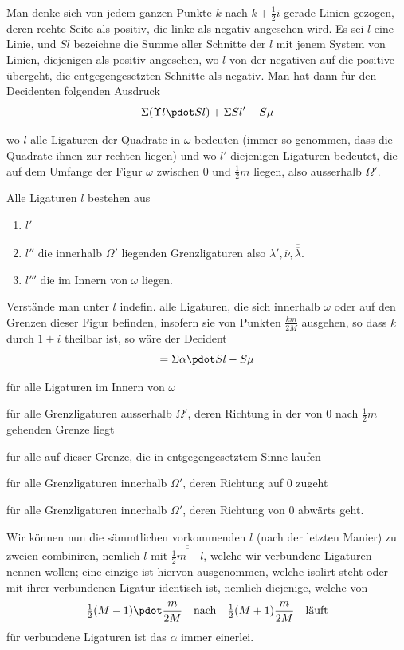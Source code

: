 Man denke sich von jedem ganzen Punkte $k$ nach $k+\frac12i$ gerade Linien gezogen, deren rechte Seite als positiv, die linke als negativ angesehen wird. Es sei $l$ eine Linie, und $Sl$ bezeichne die Summe aller Schnitte der $l$ mit jenem System von Linien, diejenigen als positiv angesehen, wo $l$ von der negativen auf die positive übergeht, die entgegengesetzten Schnitte als negativ. Man hat dann für den Decidenten folgenden Ausdruck
\[
\Sigma(\Upsilon l\pdot Sl)+\Sigma Sl'-S\mu
\]

wo $l$ alle Ligaturen der Quadrate in $\omega$ bedeuten (immer so genommen, dass die Quadrate ihnen zur rechten liegen) und wo $l'$ diejenigen Ligaturen bedeutet, die auf dem Umfange der Figur $\omega$ zwischen $0$ und $\frac12m$ liegen, also ausserhalb $\Omega'$.

Alle Ligaturen $l$ bestehen aus
\begin{enumerate}
\item[1)] $l'$
\item[2)] $l''$ die innerhalb $\Omega'$ liegenden Grenzligaturen also $\lambda',\overline{\overline\nu},\overline{\overline\lambda}$.
\item[3)] $l'''$ die im Innern von $\omega$ liegen.
\end{enumerate}
Verstände man unter $l$ indefin. alle Ligaturen, die sich innerhalb $\omega$ oder auf den Grenzen dieser Figur befinden, insofern sie von Punkten $\frac{km}{2M}$ ausgehen, so dass $k$ durch $1+i$ theilbar ist, so wäre der Decident
\[
=\Sigma\alpha\pdot Sl-S\mu
\]

\begin{list}{}{\setlength{\labelwidth}{5em}\setlength{\leftmargin}{5.5em}}
\item[wo $\alpha=1$] für alle Ligaturen im Innern von $\omega$
\item[$\alpha=\Upsilon l+1$] für alle Grenzligaturen ausserhalb $\Omega'$, deren Richtung in der von $0$ nach $\frac12m$ gehenden Grenze liegt
\end{list}


\begin{list}{}{\setlength{\labelwidth}{9em}\setlength{\leftmargin}{9.5em}}
\item[$\alpha=-(\Upsilon\overline{\overline\lambda}+1)=-\Upsilon l$] für alle auf dieser Grenze, die in entgegengesetztem Sinne laufen
\item[$\alpha=\Upsilon l$] für alle Grenzligaturen innerhalb $\Omega'$, deren Richtung auf $0$ zugeht
\item[$\alpha=-\Upsilon l+1$] für alle Grenzligaturen innerhalb $\Omega'$, deren Richtung von $0$ abwärts geht.
\end{list}

Wir können nun die sämmtlichen vorkommenden $l$ (nach der letzten Manier) zu zweien combiniren, nemlich $l$ mit $\overline{\overline{\frac12m-l}}$, welche wir verbundene Ligaturen nennen wollen; eine einzige ist hiervon ausgenommen, welche isolirt steht oder mit ihrer verbundenen Ligatur identisch ist, nemlich diejenige, welche von
\[
\tfrac12(M-1)\pdot\frac{m}{2M}\quad\text{nach}\quad\tfrac12(M+1)\frac{m}{2M}\quad\text{läuft}
\]
für verbundene Ligaturen ist das $\alpha$ immer einerlei.
